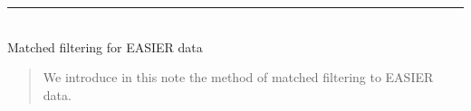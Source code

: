 \documentclass[twoside, final, 11pt]{articleMine}
\begin{document}
\modulolinenumbers[2]



\renewcommand\linenumberfont{\small\rmfamily}
\begin{center}
  \vspace*{-13ex}

  \rule{\linewidth}{0.1mm}  \\[17mm] {\huge  Matched filtering for EASIER data}
     \begin{flushright}
       \small 
     
     \end{flushright}

\end{center}
% 
\vspace*{2ex} 
%
\thispagestyle{empty}
\noindent
\begin{abstract}
  \noindent
We introduce in this note the method of matched filtering to EASIER data.
\end{abstract}

%
\thispagestyle{empty}
\noindent
%





\end{document}

